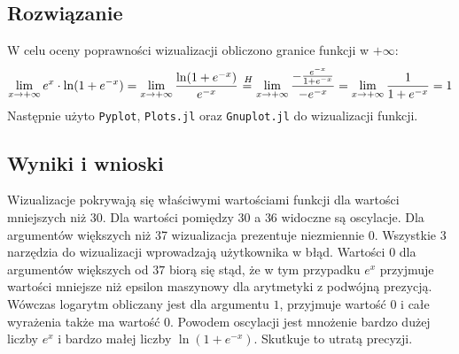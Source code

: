 \documentclass{article}
\newcommand*\Heq{\ensuremath{\overset{\kern2pt H}{=}}}
\begin{document}
\subsection{Rozwiązanie}
W celu oceny poprawności wizualizacji obliczono granice funkcji w $+\infty$:
$$
\lim_{x \rightarrow +\infty} e^x \cdot \ln(1 + e^{-x}) = \lim_{x \rightarrow +\infty} \frac{\ln(1 + e^{-x})}{e^{-x}} \Heq \lim_{x \rightarrow +\infty} \frac{-\frac{e^{-x}}{1 + e^{-x}}}{-e^{-x}} = \lim_{x \rightarrow +\infty} \frac{1}{1 + e^{-x}} = 1
$$
Następnie użyto \texttt{Pyplot}, \texttt{Plots.jl} oraz \texttt{Gnuplot.jl} do wizualizacji funkcji.

\subsection{Wyniki i wnioski}
Wizualizacje pokrywają się właściwymi wartościami funkcji dla wartości mniejszych niż $30$. Dla wartości pomiędzy $30$ a $36$ widoczne są oscylacje. Dla argumentów większych niż 37 wizualizacja prezentuje niezmiennie $0$.
Wszystkie 3 narzędzia do wizualizacji wprowadzają użytkownika w błąd. 
\newline Wartości $0$ dla argumentów większych od $37$ biorą się stąd, że w tym przypadku $e^x$ przyjmuje wartości mniejsze niż epsilon maszynowy dla arytmetyki z podwójną prezycją. Wówczas logarytm obliczany jest dla argumentu $1$, przyjmuje wartość $0$ i całe wyrażenia także ma wartość $0$.
\newline Powodem oscylacji jest mnożenie bardzo dużej liczby $e^x$ i bardzo małej liczby $\ln(1 + e^{-x})$. Skutkuje to utratą precyzji.
\end{document}
